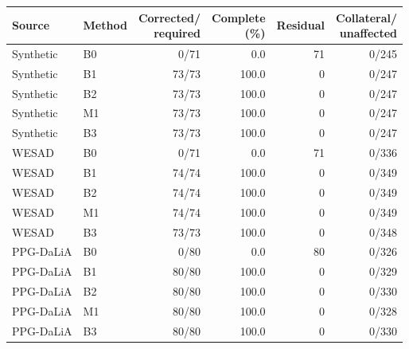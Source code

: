 \begin{tabular}{llrrrr}
\toprule
Source & Method & \shortstack{Corrected/\\required} & \shortstack{Complete\\(\%)} & Residual & \shortstack{Collateral/\\unaffected} \\
\midrule
Synthetic & B0 & 0/71 & 0.0 & 71 & 0/245 \\
Synthetic & B1 & 73/73 & 100.0 & 0 & 0/247 \\
Synthetic & B2 & 73/73 & 100.0 & 0 & 0/247 \\
Synthetic & M1 & 73/73 & 100.0 & 0 & 0/247 \\
Synthetic & B3 & 73/73 & 100.0 & 0 & 0/247 \\
WESAD & B0 & 0/71 & 0.0 & 71 & 0/336 \\
WESAD & B1 & 74/74 & 100.0 & 0 & 0/349 \\
WESAD & B2 & 74/74 & 100.0 & 0 & 0/349 \\
WESAD & M1 & 74/74 & 100.0 & 0 & 0/349 \\
WESAD & B3 & 73/73 & 100.0 & 0 & 0/348 \\
PPG-DaLiA & B0 & 0/80 & 0.0 & 80 & 0/326 \\
PPG-DaLiA & B1 & 80/80 & 100.0 & 0 & 0/329 \\
PPG-DaLiA & B2 & 80/80 & 100.0 & 0 & 0/330 \\
PPG-DaLiA & M1 & 80/80 & 100.0 & 0 & 0/328 \\
PPG-DaLiA & B3 & 80/80 & 100.0 & 0 & 0/330 \\
\bottomrule
\end{tabular}
